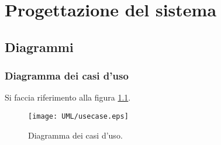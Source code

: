 %
%
%
%


\chapter{Progettazione del sistema}




\section{Diagrammi}\label{diagrammi}


\subsection{Diagramma dei casi d'uso}
Si faccia riferimento alla figura \ref{fig:usecasediag}.
\begin{figure}[ht]
	\centering
	\texttt{[image: UML/usecase.eps]}
	\caption{Diagramma dei casi d'uso.}
	\label{fig:usecasediag}
\end{figure}



